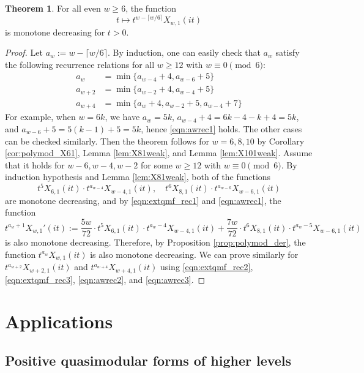 \documentclass[10pt,reqno]{amsproc}
\newcommand{\1}{\mathds{1}}	%
\theoremstyle{definition}
\newtheorem{theorem}{Theorem}[section]
\theoremstyle{remark}
\begin{document}
\begin{theorem}
    \label{thm:weakconj}
    For all even $w \ge 6$, the function 
    \[
    t \mapsto t^{w-\lceil w/6 \rceil} X_{w, 1}(it)
    \]
    is monotone decreasing for $t > 0$.
\end{theorem}
\begin{proof}
    Let $a_w := w - \lceil w/6 \rceil$.
    By induction, one can easily check that $a_w$ satisfy the following recurrence relations for all $w \ge 12$ with $w \equiv 0 \pmod{6}$:
    \begin{align}
        a_w &= \min \{a_{w-4} + 4, a_{w-6} + 5\} \label{eqn:awrec1} \\
        a_{w+2} &= \min \{a_{w-2} + 4, a_{w-4} + 5\} \label{eqn:awrec2} \\
        a_{w+4} &= \min \{a_w + 4, a_{w-2} + 5, a_{w-4} + 7\} \label{eqn:awrec3}
    \end{align}
    For example, when $w = 6k$, we have $a_w = 5k$, $a_{w-4} + 4 = 6k - 4 - k + 4 = 5k$, and $a_{w-6} + 5 = 5(k-1) + 5 = 5k$, hence \eqref{eqn:awrec1} holds.
    The other cases can be checked similarly.
    Then the theorem follows for $w = 6, 8, 10$ by Corollary \ref{cor:polymod_X61}, Lemma \ref{lem:X81weak}, and Lemma \ref{lem:X101weak}.
    Assume that it holds for $w -6, w-4, w-2$ for some $w \ge 12$ with $w \equiv 0 \pmod{6}$.
    By induction hypothesis and Lemma \ref{lem:X81weak}, both of the functions
    \[
    t^5 X_{6, 1}(it) \cdot t^{a_{w-4}} X_{w-4, 1}(it), \quad t^6 X_{8, 1}(it) \cdot t^{a_{w-6}} X_{w-6, 1}(it)
    \]
    are monotone decreasing, and by \eqref{eqn:extqmf_rec1} and \eqref{eqn:awrec1}, the function
    \[
    t^{a_w + 1} X_{w, 1}'(it) := \frac{5w}{72} \cdot t^5 X_{6, 1}(it) \cdot t^{a_w - 4} X_{w-4, 1}(it) + \frac{7w}{72} \cdot t^6 X_{8, 1}(it) \cdot t^{a_w - 5} X_{w-6, 1}(it)
    \]
    is also monotone decreasing.
    Therefore, by Proposition \ref{prop:polymod_der}, the function $t^{a_w} X_{w, 1}(it)$ is also monotone decreasing.
    We can prove similarly for $t^{a_{w+2}} X_{w+2, 1}(it)$ and $t^{a_{w+4}} X_{w+4, 1}(it)$ using \eqref{eqn:extqmf_rec2}, \eqref{eqn:extqmf_rec3}, \eqref{eqn:awrec2}, and \eqref{eqn:awrec3}.
\end{proof}

\section{Applications}

\subsection{Positive quasimodular forms of higher levels}
\label{subsec:application_posqmf}
\end{document}
